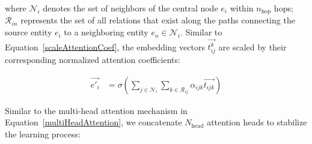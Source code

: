 %
%
%
%
%
where $\mathcal{N}_i$ denotes the set of neighbors of the central node $e_i$ within $n_{\text{hop}}$ hops; $\mathcal{R}_{in}$ represents the set of all relations that exist along the paths connecting the source entity $e_i$ to a neighboring entity $e_n \in \mathcal{N}_i$. Similar to Equation~\ref{scaleAttentionCoef}, the embedding vectors $\overrightarrow{t^k_{ij}}$ are scaled by their corresponding normalized attention coefficients:

\begin{align}
	{\overrightarrow{e'_{i}}}&={\sigma\left(\sum_{j \in \mathcal{N}_i} \sum_{k \in \mathcal{R}_{ij}} \alpha_{ijk} \overrightarrow{t_{ijk}}\right)}
\end{align}

Similar to the multi-head attention mechanism in Equation~\ref{multiHeadAttention}, we concatenate $N_{\text{head}}$ attention heads to stabilize the learning process:


